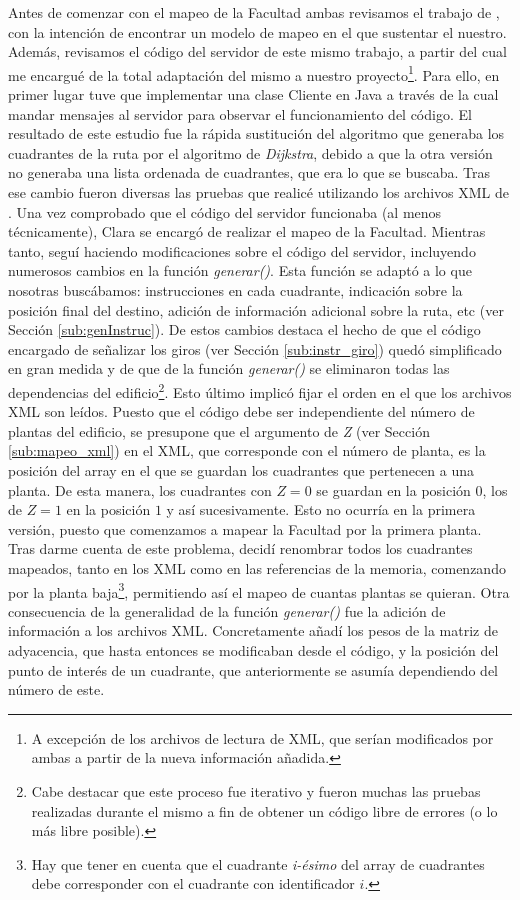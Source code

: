 Antes de comenzar con el mapeo de la Facultad ambas revisamos el trabajo de \cite{TFGguia}, con la intención de encontrar un modelo de mapeo en el que sustentar el nuestro. Además, revisamos el código del servidor de este mismo trabajo, a partir del cual me encargué de la total adaptación del mismo a nuestro proyecto\footnote{A excepción de los archivos de lectura de XML, que serían modificados por ambas a partir de la nueva información añadida.}. Para ello, en primer lugar tuve que implementar una clase Cliente en Java a través de la cual mandar mensajes al servidor para observar el funcionamiento del código. El resultado de este estudio fue la rápida sustitución del algoritmo que generaba los cuadrantes de la ruta por el algoritmo de \textit{Dijkstra}, debido a que la otra versión no generaba una lista ordenada de cuadrantes, que era lo que se buscaba. Tras ese cambio fueron diversas las pruebas que realicé utilizando los archivos XML de \cite{TFGguia}. Una vez comprobado que el código del servidor funcionaba (al menos técnicamente), Clara se encargó de realizar el mapeo de la Facultad. Mientras tanto, seguí haciendo modificaciones sobre el código del servidor, incluyendo numerosos cambios en la función \textit{generar()}. Esta función se adaptó a lo que nosotras buscábamos: instrucciones en cada cuadrante, indicación sobre la posición final del destino, adición de información adicional sobre la ruta, etc (ver Sección \ref{sub:genInstruc}). De estos cambios destaca el hecho de que el código encargado de señalizar los giros (ver Sección \ref{sub:instr_giro}) quedó simplificado en gran medida y de que de la función \textit{generar()} se eliminaron todas las dependencias del edificio\footnote{Cabe destacar que este proceso fue iterativo y fueron muchas las pruebas realizadas durante el mismo a fin de obtener un código libre de errores (o lo más libre posible).}. Esto último implicó fijar el orden en el que los archivos XML son leídos. Puesto que el código debe ser independiente del número de plantas del edificio, se presupone que el argumento de \textit{Z} (ver Sección \ref{sub:mapeo_xml}) en el XML, que corresponde con el número de planta, es la posición del array en el que se guardan los cuadrantes que pertenecen a una planta. De esta manera, los cuadrantes con $Z = 0$ se guardan en la posición $0$, los de $Z = 1$ en la posición $1$ y así sucesivamente. Esto no ocurría en la primera versión, puesto que comenzamos a mapear la Facultad por la primera planta. Tras darme cuenta de este problema, decidí renombrar todos los cuadrantes mapeados, tanto en los XML como en las referencias de la memoria, comenzando por la planta baja\footnote{Hay que tener en cuenta que el cuadrante \textit{i-ésimo} del array de cuadrantes debe corresponder con el cuadrante con identificador $i$.}, permitiendo así el mapeo de cuantas plantas se quieran. Otra consecuencia de la generalidad de la función \textit{generar()} fue la adición de información a los archivos XML. Concretamente añadí los pesos de la matriz de adyacencia, que hasta entonces se modificaban desde el código, y la posición del punto de interés de un cuadrante, que anteriormente se asumía dependiendo del número de este. 

